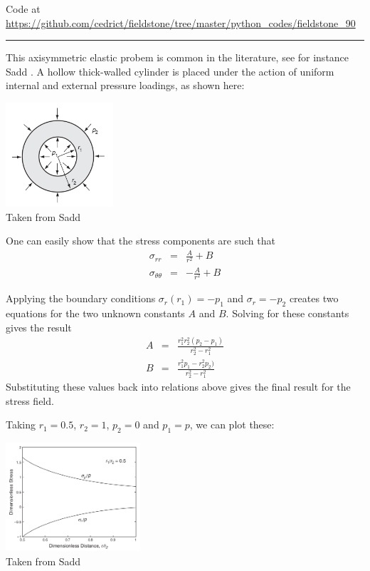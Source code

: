 

\begin{center}
Code at \url{https://github.com/cedrict/fieldstone/tree/master/python_codes/fieldstone_90}
\end{center}

\par\noindent\rule{\textwidth}{0.4pt}

This axisymmetric elastic probem is common in the literature, see for instance Sadd \cite{sadd14}.
A hollow thick-walled cylinder is placed under the
action of uniform internal and external pressure loadings, as shown here:

\begin{center}
\includegraphics[width=4cm]{python_codes/fieldstone_90/images/sadda}\\
{\captionfont Taken from Sadd \cite{sadd14}}
\end{center}
One can easily show that the stress components are such that
\begin{eqnarray}
\sigma_{rr} &=& \frac{A}{r^2} + B \\
\sigma_{\theta\theta} &=& -\frac{A}{r^2} + B
\end{eqnarray}

Applying the boundary conditions 
$\sigma_r(r_1)=-p_1$ and $\sigma_r=-p_2$ 
creates two equations
for the two unknown constants $A$ and $B$. 
Solving for these constants gives the result
\begin{eqnarray}
A &=& \frac{r_1^2r_2^2(p_2-p_1)}{r_2^2-r_1^2} \\
B &=& \frac{r_1^2p_1-r_2^2p_2 )}{r_2^2-r_1^2} 
\end{eqnarray}
Substituting these values back into relations above gives the final result for the stress field.

Taking $r_1=0.5$, $r_2=1$, $p_2=0$ and $p_1=p$, we can plot these:
\begin{center}
\includegraphics[width=5cm]{python_codes/fieldstone_90/images/saddb}\\
{\captionfont Taken from Sadd \cite{sadd14}}
\end{center}

